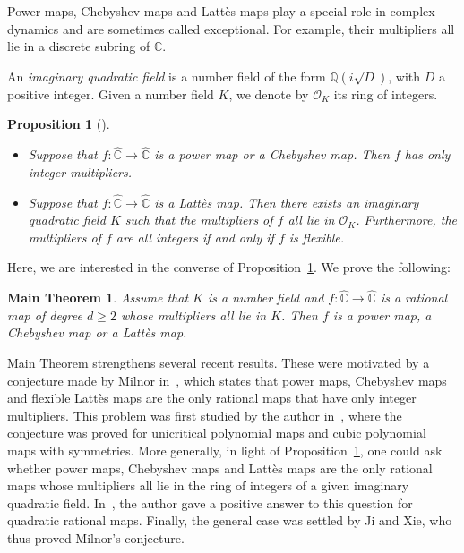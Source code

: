 \documentclass[JEP,XML,SOM,Unicode,published]{cedram}
\theoremstyle{plain}
\newtheorem*{maintheorem}{Main Theorem}
\newtheorem{proposition}[theorem]{Proposition}
\theoremstyle{definition}
\theoremstyle{remark}
\begin{document}
Power maps, Chebyshev maps and Lattès maps play a special role in complex dynamics and are sometimes called exceptional. For example, their multipliers all lie in a discrete subring of $\mathbb{C}$.

An \emph{imaginary quadratic field} is a number field of the form $\mathbb{Q}(i \sqrt{D})$, with $D$ a positive integer. Given a number field $K$, we denote by $\mathcal{O}_{K}$ its ring of integers.

\skpt
\begin{proposition}[{\cite[Cor.\,3.9 \& Lem.\,5.6]{M2006}}]
\label{proposition:special}
\begin{itemize}
\item Suppose that $f \colon \widehat{\mathbb{C}} \to \widehat{\mathbb{C}}$ is a power map or a Chebyshev map. Then $f$ has only integer multipliers.
\item Suppose that $f \colon \widehat{\mathbb{C}} \to \widehat{\mathbb{C}}$ is a Lattès map. Then there exists an imaginary quadratic field $K$ such that the multipliers of $f$ all lie in $\mathcal{O}_{K}$. Furthermore, the multipliers of $f$ are all integers if and only if $f$ is flexible.
\end{itemize}
\end{proposition}

Here, we are interested in the converse of Proposition~\ref{proposition:special}. We prove the following:

\begin{maintheorem}
Assume that $K$ is a number field and $f \colon \widehat{\mathbb{C}} \to \widehat{\mathbb{C}}$ is a rational map of degree $d \geq 2$ whose multipliers all lie in $K$. Then $f$ is a power map, a Chebyshev map or a Lattès map.
\end{maintheorem}

Main Theorem strengthens several recent results. These were motivated by a conjecture made by Milnor in~\cite{M2006}, which states that power maps, Chebyshev maps and flexible Lattès maps are the only rational maps that have only integer multipliers. This problem was first studied by the author in~\cite{H2021}, where the conjecture was proved for unicritical polynomial maps and cubic polynomial maps with symmetries. More generally, in light of Proposition~\ref{proposition:special}, one could ask whether power maps, Chebyshev maps and Lattès maps are the only rational maps whose multipliers all lie in the ring of integers of a given imaginary quadratic field. In~\cite{H2022}, the author gave a positive answer to this question for quadratic rational maps. Finally, the general case was settled by Ji and Xie, who thus proved Milnor's conjecture.
\end{document}
